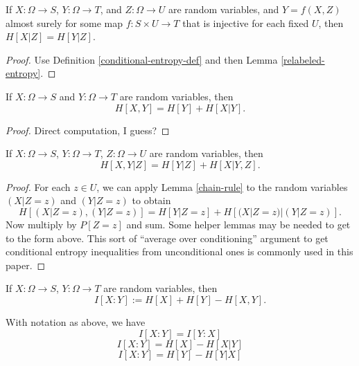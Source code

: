 \begin{lemma}\label{relabeled-entropy-cond}   If $X: \Omega \to S$, $Y: \Omega \to T$, and $Z: \Omega \to U$ are random variables, and $Y = f(X,Z)$ almost surely for some map $f: S \times U \to T$ that is injective for each fixed $U$, then $H[X|Z] = H[Y|Z]$.
\end{lemma}

\begin{proof}   Use Definition \ref{conditional-entropy-def} and then Lemma \ref{relabeled-entropy}.
\end{proof}


\begin{lemma}\label{chain-rule}
  If $X: \Omega \to S$ and $Y: \Omega \to T$ are random variables, then
  $$ H[ X,Y  ] = H[Y] + H[X|Y].$$
\end{lemma}

\begin{proof} Direct computation, I guess?
\end{proof}

\begin{lemma}\label{conditional-chain-rule} 
  If $X: \Omega \to S$, $Y: \Omega \to T$, $Z: \Omega \to U$ are random variables, then
$$ H[  X,Y | Z ] = H[Y | Z] + H[X|Y, Z].$$
\end{lemma}

\begin{proof}   For each $z \in U$, we can apply Lemma \ref{chain-rule} to the random variables $(X|Z=z)$ and $(Y|Z=z)$ to obtain
$$ H[ (X|Z=z),(Y|Z=z) ] = H[Y|Z=z] + H[(X|Z=z)|(Y|Z=z)].$$
Now multiply by $P[Z=z]$ and sum.  Some helper lemmas may be needed to get to the form above.  This sort of ``average over conditioning'' argument to get conditional entropy inequalities from unconditional ones is commonly used in this paper.
\end{proof}

\begin{definition}\label{information-def} If $X: \Omega \to S$, $Y: \Omega \to T$ are random variables, then
  $$ I[ X : Y ] := H[X] + H[Y] - H[X,Y].$$
\end{definition}

\begin{lemma}\label{alternative-mutual}
  With notation as above, we have
$$  I[X : Y] = I[Y:X]$$
$$  I[X : Y] = H[X] - H[X|Y]$$
$$  I[X : Y] = H[Y] - H[Y|X]$$
\end{lemma}

